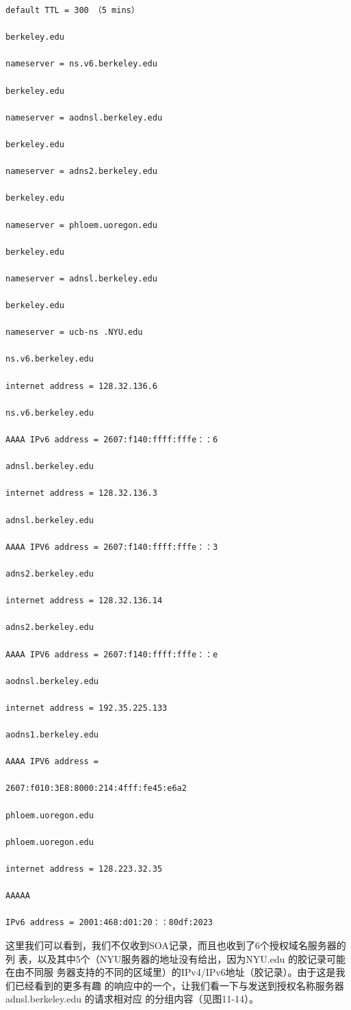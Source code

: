 \begin{verbatim}
default TTL = 300 （5 mins）

berkeley.edu

nameserver = ns.v6.berkeley.edu

berkeley.edu

nameserver = aodnsl.berkeley.edu

berkeley.edu

nameserver = adns2.berkeley.edu

berkeley.edu

nameserver = phloem.uoregon.edu

berkeley.edu

nameserver = adnsl.berkeley.edu

berkeley.edu

nameserver = ucb-ns .NYU.edu

ns.v6.berkeley.edu

internet address = 128.32.136.6

ns.v6.berkeley.edu

AAAA IPv6 address = 2607:f140:ffff:fffe：：6

adnsl.berkeley.edu

internet address = 128.32.136.3

adnsl.berkeley.edu

AAAA IPV6 address = 2607:f140:ffff:fffe：：3

adns2.berkeley.edu

internet address = 128.32.136.14

adns2.berkeley.edu

AAAA IPV6 address = 2607:f140:ffff:fffe：：e

aodnsl.berkeley.edu

internet address = 192.35.225.133

aodns1.berkeley.edu

AAAA IPV6 address =

2607:f010:3E8:8000:214:4fff:fe45:e6a2

phloem.uoregon.edu

phloem.uoregon.edu

internet address = 128.223.32.35

AAAAA

IPv6 address = 2001:468:d01:20：：80df:2023

\end{verbatim}
这里我们可以看到，我们不仅收到SOA记录，而且也收到了6个授权域名服务器的列
表，以及其中5个（NYU服务器的地址没有给出，因为NYU.edu 的胶记录可能在由不同服
务器支持的不同的区域里）的IPv4/IPv6地址（胶记录）。由于这是我们已经看到的更多有趣
的响应中的一个，让我们看一下与发送到授权名称服务器 adnsl.berkeley.edu 的请求相对应
的分组内容（见图11-14）。

